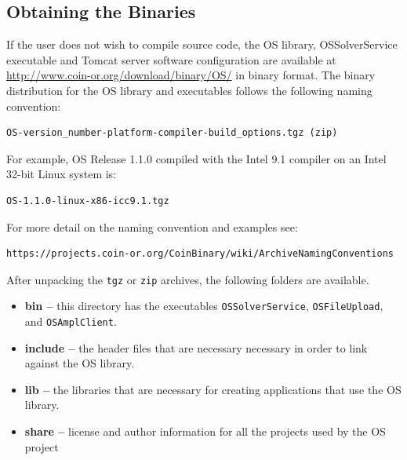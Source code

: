 \documentclass[11pt]{article}
\renewcommand{\_}{{\char"5F}}
\renewcommand{\{}{{\char"7B}}
\renewcommand{\}}{{\char"7D}}
\renewcommand{\^}{{\char"0D}}
\renewcommand{\'}{{\char"0D}}
\begin{document}
\subsection{Obtaining the Binaries}\label{section:obtainingbinaries}

If the user does not wish to compile source code, the OS library, OSSolverService executable 
and Tomcat server software configuration are available at \url{http://www.coin-or.org/download/binary/OS/}%
  in binary format.    The binary distribution for the OS library and executables follows the following naming convention:
\begin{verbatim}
OS-version_number-platform-compiler-build_options.tgz (zip)
\end{verbatim}
For example, OS  Release 1.1.0 compiled with the Intel 9.1 compiler on an Intel 32-bit Linux system is:
\begin{verbatim}
OS-1.1.0-linux-x86-icc9.1.tgz
\end{verbatim}

For more detail on the naming convention and examples see:

\begin{verbatim}
https://projects.coin-or.org/CoinBinary/wiki/ArchiveNamingConventions
\end{verbatim}


After unpacking the {\tt tgz} or {\tt zip} archives, the following folders are available.
\begin{itemize}

\item[] {\bf bin --} this directory has the executables {\tt OSSolverService}, {\tt OSFileUpload}, and {\tt OSAmplClient}.

\item[]  {\bf include --} the header files that are necessary necessary  in order to link against the OS library.

\item[] {\bf lib --} the libraries that are necessary for creating applications that use the OS library.

\item[] {\bf  share --} license and author information for all the projects used by the OS project 
\end{itemize}
\end{document}
